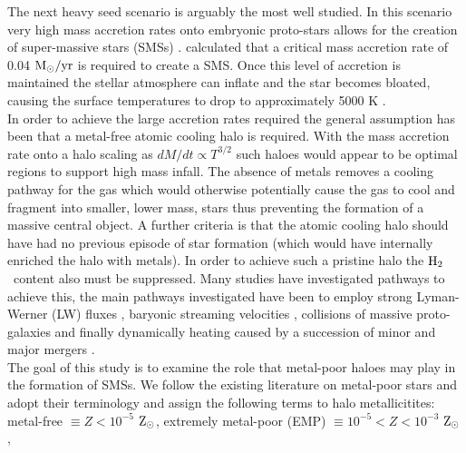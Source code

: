 \documentclass[graphics, twocolumn, usenatbib]{mn2e}
\newcommand{\msolaryr} {$\rm{M_{\odot}/yr}~$}
\newcommand{\zsolarc} {$\rm{Z_{\odot}}$}
\newcommand{\molH} {$\rm{H_2}$~}
\begin{document}
\indent The next heavy seed scenario is arguably the most well studied. In this scenario very high
mass accretion rates onto embryonic proto-stars allows for the creation of super-massive stars (SMSs)
\citep{Shapiro_1979, Begelman_2008, Schleicher_2013, Hosokawa_2013, Inayoshi_2014, Sakurai_2016,
  Umeda_2016, Haemmerle_2017,Woods_2017, Woods_2018, Regan_2018b}. \cite{Sakurai_2016} calculated
that a critical mass accretion rate of 0.04 \msolaryr is required to create a SMS.
Once this level of accretion is maintained the stellar atmosphere can inflate and the star becomes
bloated, causing the surface temperatures to drop to approximately 5000 K \citep{Hosokawa_2013, 
Woods_2017}. \\
\indent In order to achieve the large accretion rates required the general assumption has been
that a metal-free atomic cooling halo is required.
With the mass accretion rate onto a halo scaling as $dM/dt \propto T^{3/2}$ such haloes would appear
to be optimal regions to support high mass infall. The absence of metals removes a cooling pathway for
the gas which would otherwise potentially cause the gas to cool and fragment into smaller, lower
mass, stars thus preventing the formation of a massive central object. A further criteria is that the
atomic cooling halo should have had no previous episode of star formation (which would have
internally enriched the halo with metals). In order to achieve such a pristine halo the \molH content
also must be suppressed. Many studies have investigated pathways to achieve this, the main pathways
investigated have been to employ strong Lyman-Werner (LW) fluxes \citep{Dijkstra_2008, Shang_2010,
  Regan_2014b, Latif_2014b, Agarwal_2015a, Latif_2015, Regan_2016a, Regan_2017, Regan_2018a},
baryonic streaming velocities
\citep{Tseliakhovich_2010, Tanaka_2014, Hirano_2017, Schauer_2017}, collisions of massive
proto-galaxies \citep{Mayer_2010, Mayer_2014, Inayoshi_2015} and finally dynamically heating caused
by a succession of minor and major mergers \citep{Yoshida_2003a, Fernandez_2014, Wise_2019}. \\
\indent The goal of this study is to examine the role that metal-poor haloes may play in the
formation of SMSs. We follow the existing literature on metal-poor stars \citep[e.g.][]{Frebel_2015}
and adopt their terminology and assign the following terms to halo metallicitites:
metal-free $\equiv Z < 10^{-5}$ \zsolarc,
extremely metal-poor (EMP) $\equiv 10^{-5} < Z < 10^{-3}$ \zsolarc,
\end{document}
